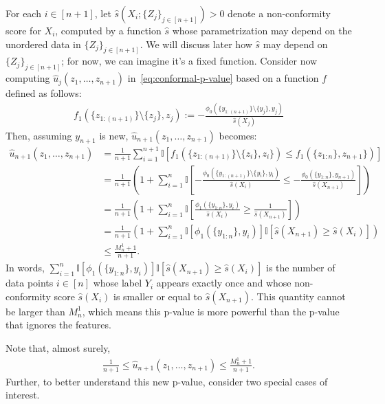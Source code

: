 \documentclass[11pt]{article}
\newcommand{\I}[1]{\mathbb{I}\left[#1\right]}
\begin{document}
For each $i \in [n+1]$, let $\hat{s}(X_i; \{Z_j\}_{j \in [n+1]}) > 0$ denote a non-conformity score for $X_i$, computed by a function $\hat{s}$ whose parametrization may depend on the unordered data in $\{Z_j\}_{j \in [n+1]}$.
We will discuss later how $\hat{s}$ may depend on $\{Z_j\}_{j \in [n+1]}$; for now, we can imagine it's a fixed function.
Consider now computing $\hat{u}_j(z_1,\ldots,z_{n+1})$ in~\eqref{eq:conformal-p-value} based on a function $f$ defined as follows:
\begin{align} \label{eq:def-f1}
  f_1(\{z_{1:(n+1)}\} \setminus \{z_j\}, z_{j})
  := - \frac{\phi_0\left( \{y_{1:(n+1)}\} \setminus \{y_j\}, y_j \right)}{\hat{s}(X_j)}
\end{align}
Then, assuming $y_{n+1}$ is  new, $\hat{u}_{n+1}(z_1,\ldots,z_{n+1})$ becomes:
\begin{align*}
  \hat{u}_{n+1}(z_1,\ldots,z_{n+1})
  & = \frac{1}{n+1} \sum_{i=1}^{n+1} \I{ f_1(\{z_{1:(n+1)}\} \setminus \{z_i\}, z_{i}\}) \leq f_1(\{z_{1:n}\}, z_{n+1}\}) } \\
    & = \frac{1}{n+1} \left( 1 + \sum_{i=1}^{n} \I{ - \frac{\phi_0\left( \{y_{1:(n+1)}\} \setminus \{y_i\}, y_i \right)}{\hat{s}(X_i)} \leq - \frac{\phi_0\left( \{y_{1:n}\}, y_{n+1} \right)}{\hat{s}(X_{n+1})} } \right) \\
    & = \frac{1}{n+1} \left( 1 + \sum_{i=1}^{n} \I{ \frac{\phi_1\left( \{y_{1:n}\}, y_i \right)}{\hat{s}(X_i)} \geq \frac{1}{\hat{s}(X_{n+1})} } \right) \\
    & = \frac{1}{n+1} \left( 1 + \sum_{i=1}^{n} \I{\phi_1\left( \{y_{1:n}\}, y_i \right)} \I{ \hat{s}(X_{n+1}) \geq \hat{s}(X_{i}) } \right) \\
    & \leq \frac{M_n^1+1}{n+1}.
\end{align*}
In words, $\sum_{i=1}^{n} \I{\phi_1\left( \{y_{1:n}\}, y_i \right)} \I{ \hat{s}(X_{n+1}) \geq \hat{s}(X_{i}) }$ is the number of data points $i \in [n]$ whose label $Y_i$ appears exactly once and whose non-conformity score $\hat{s}(X_{i})$ is smaller or equal to $\hat{s}(X_{n+1})$. 
This quantity cannot be larger than $M_n^1$, which means this p-value is more powerful than the p-value that ignores the features.

Note that, almost surely,
\begin{align*}
 \frac{1}{n+1} \leq \hat{u}_{n+1}(z_1,\ldots,z_{n+1}) \leq \frac{M_n^1+1}{n+1}.
\end{align*}
Further, to better understand this new p-value, consider two special cases of interest. 
\end{document}

